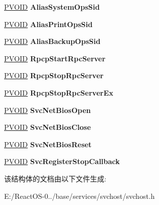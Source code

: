 \begin{DoxyCompactItemize}
\hyperlink{interfacevoid}{P\+V\+O\+ID} {\bfseries Alias\+System\+Ops\+Sid}
\item 
\mbox{\label{struct___s_v_c_h_o_s_t___g_l_o_b_a_l_s_ada51c6b0dd7fa3829c37d09ef70c935a}} 
\hyperlink{interfacevoid}{P\+V\+O\+ID} {\bfseries Alias\+Print\+Ops\+Sid}
\item 
\mbox{\label{struct___s_v_c_h_o_s_t___g_l_o_b_a_l_s_a79310cf179e9dfc7a81fb7e9454a4475}} 
\hyperlink{interfacevoid}{P\+V\+O\+ID} {\bfseries Alias\+Backup\+Ops\+Sid}
\item 
\mbox{\label{struct___s_v_c_h_o_s_t___g_l_o_b_a_l_s_ad423e223c33544a0a50dd492b1ef92e9}} 
\hyperlink{interfacevoid}{P\+V\+O\+ID} {\bfseries Rpcp\+Start\+Rpc\+Server}
\item 
\mbox{\label{struct___s_v_c_h_o_s_t___g_l_o_b_a_l_s_a7846ef4cb5c6b3f1da984422fb3ef93d}} 
\hyperlink{interfacevoid}{P\+V\+O\+ID} {\bfseries Rpcp\+Stop\+Rpc\+Server}
\item 
\mbox{\label{struct___s_v_c_h_o_s_t___g_l_o_b_a_l_s_afff2fd4eecd252476997f5c2f07cb099}} 
\hyperlink{interfacevoid}{P\+V\+O\+ID} {\bfseries Rpcp\+Stop\+Rpc\+Server\+Ex}
\item 
\mbox{\label{struct___s_v_c_h_o_s_t___g_l_o_b_a_l_s_a34ddcfe82ac28b1921286d287c03d486}} 
\hyperlink{interfacevoid}{P\+V\+O\+ID} {\bfseries Svc\+Net\+Bios\+Open}
\item 
\mbox{\label{struct___s_v_c_h_o_s_t___g_l_o_b_a_l_s_a37c4fdc94bbeaf1182b897d58237fce3}} 
\hyperlink{interfacevoid}{P\+V\+O\+ID} {\bfseries Svc\+Net\+Bios\+Close}
\item 
\mbox{\label{struct___s_v_c_h_o_s_t___g_l_o_b_a_l_s_a11ba744d222a63c52f4ecc91aedccc86}} 
\hyperlink{interfacevoid}{P\+V\+O\+ID} {\bfseries Svc\+Net\+Bios\+Reset}
\item 
\mbox{\label{struct___s_v_c_h_o_s_t___g_l_o_b_a_l_s_a48b8df765827b72c00794ce96a65d3bd}} 
\hyperlink{interfacevoid}{P\+V\+O\+ID} {\bfseries Svc\+Register\+Stop\+Callback}
\end{DoxyCompactItemize}


该结构体的文档由以下文件生成\+:\begin{DoxyCompactItemize}
\item 
E\+:/\+React\+O\+S-\/0../base/services/svchost/svchost.\+h\end{DoxyCompactItemize}
